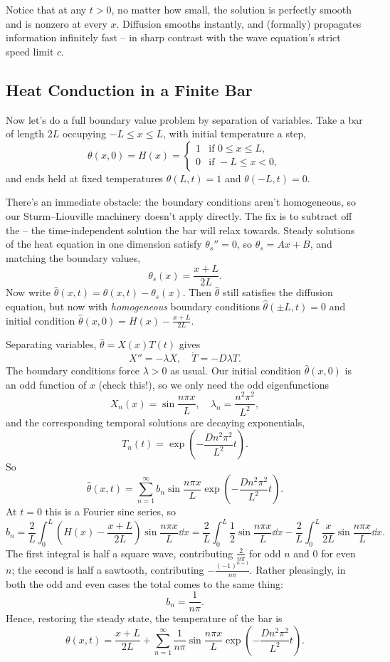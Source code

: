 Notice that at any $t > 0$, no matter how small, the solution is perfectly smooth and is nonzero at every $x$. Diffusion smooths instantly, and (formally) propagates information infinitely fast -- in sharp contrast with the wave equation's strict speed limit $c$.

\subsection{Heat Conduction in a Finite Bar}

Now let's do a full boundary value problem by separation of variables. Take a bar of length $2L$ occupying $-L \leq x \leq L$, with initial temperature a step,
$$
\theta(x, 0) = H(x) = \begin{cases}
    1 &\mbox{if } 0 \leq x \leq L, \\
    0 &\mbox{if } -L \leq x < 0,
\end{cases}
$$
and ends held at fixed temperatures $\theta(L, t) = 1$ and $\theta(-L, t) = 0$.

There's an immediate obstacle: the boundary conditions aren't homogeneous, so our Sturm--Liouville machinery doesn't apply directly. The fix is to subtract off the  -- the time-independent solution the bar will relax towards. Steady solutions of the heat equation in one dimension satisfy $\theta_s'' = 0$, so $\theta_s = Ax + B$, and matching the boundary values,
$$
\theta_s(x) = \frac{x + L}{2L}.
$$
Now write $\hat{\theta}(x, t) = \theta(x, t) - \theta_s(x)$. Then $\hat{\theta}$ still satisfies the diffusion equation, but now with \emph{homogeneous} boundary conditions $\hat\theta(\pm L, t) = 0$ and initial condition $\hat\theta(x, 0) = H(x) - \frac{x + L}{2L}$.

Separating variables, $\hat\theta = X(x) T(t)$ gives
$$
X'' = -\lambda X, \quad \dot{T} = -D \lambda T.
$$
The boundary conditions force $\lambda > 0$ as usual. Our initial condition $\hat\theta(x,0)$ is an odd function of $x$ (check this!), so we only need the odd eigenfunctions
$$
X_n(x) = \sin \frac{n \pi x}{L}, \quad \lambda_n = \frac{n^2 \pi^2}{L^2},
$$
and the corresponding temporal solutions are decaying exponentials,
$$
T_n(t) = \exp\left(-\frac{D n^2 \pi^2}{L^2} t\right).
$$
So
$$
\hat\theta(x, t) = \sum_{n = 1}^{\infty} b_n \sin \frac{n \pi x}{L} \exp\left(-\frac{D n^2 \pi^2}{L^2}t\right).
$$
At $t = 0$ this is a Fourier sine series, so
$$
b_n = \frac{2}{L}\int_0^L \left(H(x) - \frac{x + L}{2L}\right)\sin\frac{n \pi x}{L} \dd x
= \frac{2}{L}\int_0^L \frac{1}{2}\sin\frac{n \pi x}{L} \dd x - \frac{2}{L}\int_0^L \frac{x}{2L}\sin\frac{n \pi x}{L} \dd x.
$$
The first integral is half a square wave, contributing $\frac{2}{n \pi}$ for odd $n$ and $0$ for even $n$; the second is half a sawtooth, contributing $-\frac{(-1)^{n+1}}{n \pi}$. Rather pleasingly, in both the odd and even cases the total comes to the same thing:
$$
b_n = \frac{1}{n \pi}.
$$
Hence, restoring the steady state, the temperature of the bar is
$$
\theta(x, t) = \frac{x + L}{2L} + \sum_{n = 1}^{\infty} \frac{1}{n \pi} \sin \frac{n \pi x}{L} \exp\left(-\frac{Dn^2 \pi^2}{L^2} t\right).
$$

